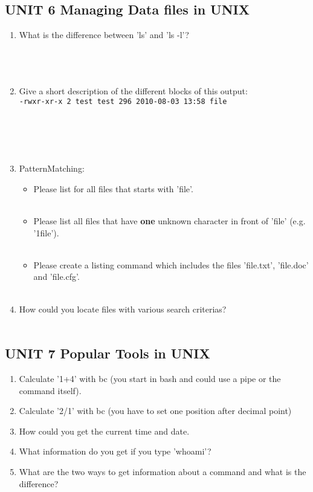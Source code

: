 \documentclass[11pt]{article}
\begin{document}
\subsection*{UNIT 6 Managing Data files in UNIX}
\begin{enumerate}
    \item What is the difference between 'ls' and 'ls -l'? \\
    \\
    \\
    \\
    \item Give a short description of the different blocks of this output: \\
    \texttt{-rwxr-xr-x 2 test test 296 2010-08-03 13:58 file} \\
    \\
    \\
    \\
    \\
    \item PatternMatching:
    \begin{itemize}
        \item Please list for all files that starts with 'file'. \\
        \\
        \item Please list all files that have \textbf{one} unknown character in front of 'file' (e.g. '1file'). \\
        \\
        \item Please create a listing command which includes the files 'file.txt', 'file.doc' and 'file.cfg'. \\
        \\
    \end{itemize}
    \item How could you locate files with various search criterias? \\
    \\
\end{enumerate}

\newpage
\subsection*{UNIT 7 Popular Tools in UNIX}
\begin{enumerate}
    \item Calculate '1+4' with bc (you start in bash and could use a pipe or the command itself).
    \item Calculate '2/1' with bc (you have to set one position after decimal point)
    \item How could you get the current time and date.
    \item What information do you get if you type 'whoami'?
    \item What are the two ways to get information about a command and what is the difference?
\end{enumerate}
    
\end{document}
